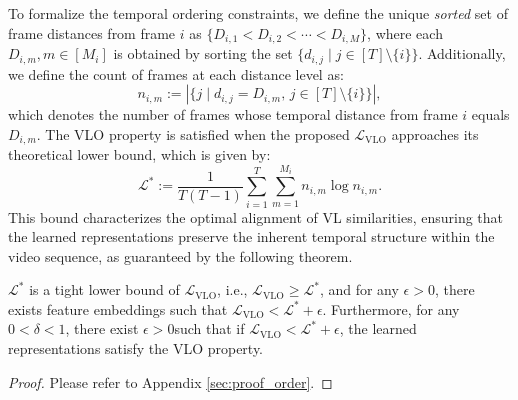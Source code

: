 To formalize the temporal ordering constraints, we define the unique \textit{sorted} set of frame distances from frame $i$ as $\{D_{i,1} < D_{i,2} < \cdots < D_{i,M}\}$, where each $D_{i,m}, m \in [M_i]$ is obtained by sorting the set $\{d_{i,j} \mid j \in [T] \setminus \{i\}\}$. Additionally, we define the count of frames at each distance level as:
\begin{equation}
    n_{i,m} := |\{j \mid d_{i,j} = D_{i,m}, \, j \in [T] \setminus \{i\}\}|, 
\end{equation}
which denotes the number of frames whose temporal distance from frame $i$ equals $D_{i,m}$. The VLO property is satisfied when the proposed $\mathcal{L}_{\mathrm{VLO}}$ approaches its theoretical lower bound, which is given by:
\begin{equation}
\mathcal{L}^*:=\frac{1}{T(T-1)} \sum_{i=1}^{T} \sum_{m=1}^{M_i} n_{i, m} \log n_{i, m}.
\end{equation}
This bound characterizes the optimal alignment of VL similarities, ensuring that the learned representations preserve the inherent temporal structure within the video sequence, as guaranteed by the following theorem.

\begin{theorem}
\label{thm:delta-ordered}
$\mathcal{L}^*$ is a tight lower bound of $\mathcal{L}_{\mathrm{VLO}}$, i.e., $\mathcal{L}_{\mathrm{VLO}} \geq \mathcal{L}^*$, and for any $\epsilon > 0$, there exists feature embeddings such that $\mathcal{L}_{\mathrm{VLO}} < \mathcal{L}^* + \epsilon$. Furthermore, for any $0 < \delta < 1$, there exist $\epsilon > 0$such that if $\mathcal{L}_{\mathrm{VLO}} < \mathcal{L}^* + \epsilon$, the learned representations satisfy the VLO property.
\end{theorem}
\begin{proof}
Please refer to Appendix \ref{sec:proof_order}.
\end{proof}


%

